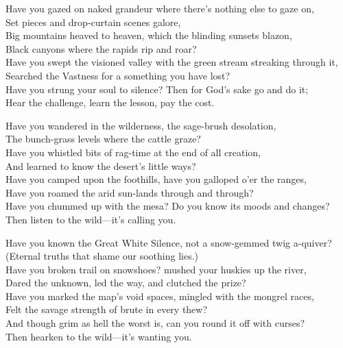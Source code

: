 
\begin{poemblock}
Have you gazed on naked grandeur where there's nothing else to gaze on,\\
\idt Set pieces and drop-curtain scenes galore,\\
Big mountains heaved to heaven, which the blinding sunsets blazon,\\
\idt Black canyons where the rapids rip and roar?\\
Have you swept the visioned valley with the green stream streaking through it,\\
\idt Searched the Vastness for a something you have lost?\\
Have you strung your soul to silence? Then for God's sake go and do it;\\
\idt Hear the challenge, learn the lesson, pay the cost.

Have you wandered in the wilderness, the sage-brush desolation,\\
\idt The bunch-grass levels where the cattle graze?\\
Have you whistled bits of rag-time at the end of all creation,\\
\idt And learned to know the desert's little ways?\\
Have you camped upon the foothills, have you galloped o'er the ranges,\\
\idt Have you roamed the arid sun-lands through and through?\\
Have you chummed up with the mesa? Do you know its moods and changes?\\
\idt Then listen to the wild—it's calling you.

Have you known the Great White Silence, not a snow-gemmed twig a-quiver?\\
\idt (Eternal truths that shame our soothing lies.)\\
Have you broken trail on snowshoes? mushed your huskies up the river,\\
\idt Dared the unknown, led the way, and clutched the prize?\\
Have you marked the map's void spaces, mingled with the mongrel races,\\
\idt Felt the savage strength of brute in every thew?\\
And though grim as hell the worst is, can you round it off with curses?\\
\idt Then hearken to the wild—it's wanting you.


\end{poemblock}
